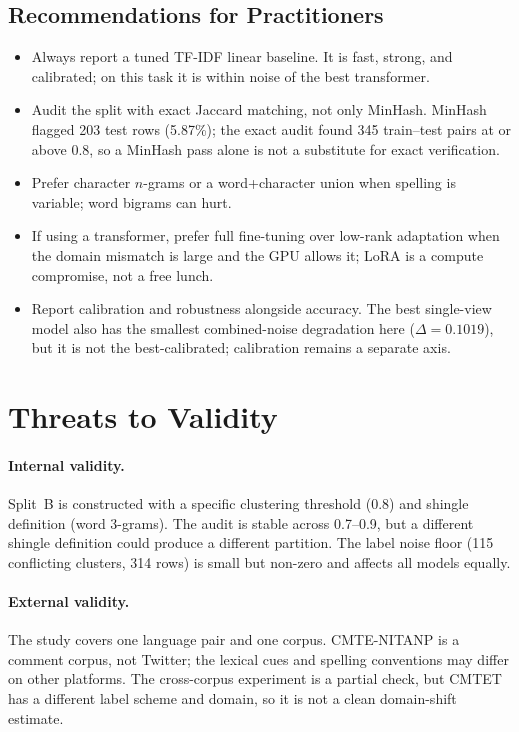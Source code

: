 \documentclass[10pt,journal]{IEEEtran}
\begin{document}
\subsection{Recommendations for Practitioners}
\begin{itemize}
\item Always report a tuned TF-IDF linear baseline. It is fast, strong, and calibrated; on this task it is within noise of the best transformer.
\item Audit the split with exact Jaccard matching, not only MinHash. MinHash flagged 203 test rows (5.87\%); the exact audit found 345 train--test pairs at or above 0.8, so a MinHash pass alone is not a substitute for exact verification.
\item Prefer character $n$-grams or a word+character union when spelling is variable; word bigrams can hurt.
\item If using a transformer, prefer full fine-tuning over low-rank adaptation when the domain mismatch is large and the GPU allows it; LoRA is a compute compromise, not a free lunch.
\item Report calibration and robustness alongside accuracy. The best single-view model also has the smallest combined-noise degradation here ($\Delta=0.1019$), but it is not the best-calibrated; calibration remains a separate axis.
\end{itemize}

\section{Threats to Validity}
\paragraph{Internal validity.} Split~B is constructed with a specific clustering threshold (0.8) and shingle definition (word 3-grams). The audit is stable across 0.7--0.9, but a different shingle definition could produce a different partition. The label noise floor (115 conflicting clusters, 314 rows) is small but non-zero and affects all models equally.
\paragraph{External validity.} The study covers one language pair and one corpus. CMTE-NITANP is a comment corpus, not Twitter; the lexical cues and spelling conventions may differ on other platforms. The cross-corpus experiment is a partial check, but CMTET has a different label scheme and domain, so it is not a clean domain-shift estimate.
\end{document}
